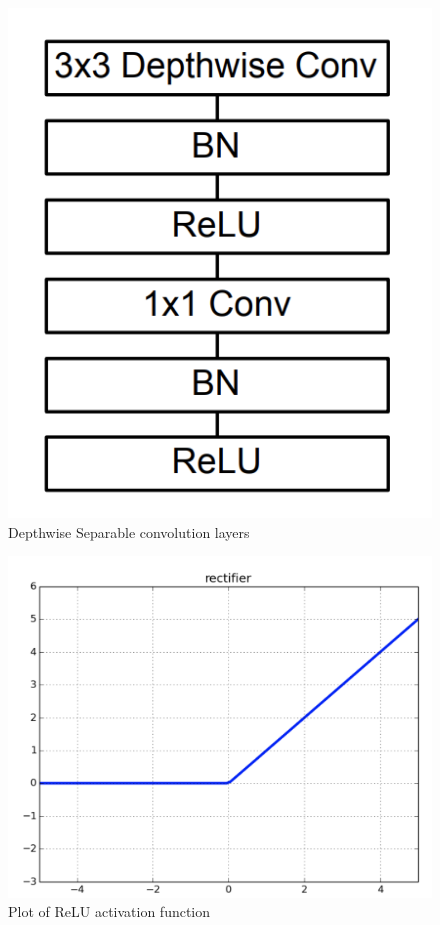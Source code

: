 \documentclass[11pt, titlepage]{article} %
\begin{document}
\begin{figure}[]
	\centering
 	\includegraphics[scale=0.5]{convolution4.png}
   	\caption{Depthwise Separable convolution layers}
   	\label{fig:convolution4}
\end{figure}

\begin{figure}[]
	\centering
   	\includegraphics[scale=0.3]{convolution5.png}
   	\caption{Plot of ReLU activation function}
   	\label{fig:convolution5}
\end{figure}
\end{document}
